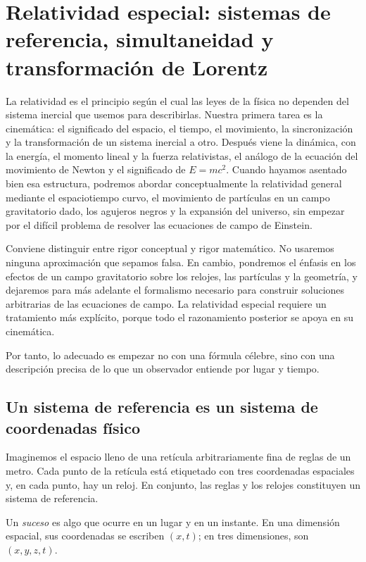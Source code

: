 \chapter{Relatividad especial: sistemas de referencia, simultaneidad y transformación de Lorentz}

La relatividad es el principio según el cual las leyes de la física no dependen del sistema inercial que usemos para describirlas. Nuestra primera tarea es la cinemática: el significado del espacio, el tiempo, el movimiento, la sincronización y la transformación de un sistema inercial a otro. Después viene la dinámica, con la energía, el momento lineal y la fuerza relativistas, el análogo de la ecuación del movimiento de Newton y el significado de \(E=mc^2\). Cuando hayamos asentado bien esa estructura, podremos abordar conceptualmente la relatividad general mediante el espaciotiempo curvo, el movimiento de partículas en un campo gravitatorio dado, los agujeros negros y la expansión del universo, sin empezar por el difícil problema de resolver las ecuaciones de campo de Einstein.

Conviene distinguir entre rigor conceptual y rigor matemático. No usaremos ninguna aproximación que sepamos falsa. En cambio, pondremos el énfasis en los efectos de un campo gravitatorio sobre los relojes, las partículas y la geometría, y dejaremos para más adelante el formalismo necesario para construir soluciones arbitrarias de las ecuaciones de campo. La relatividad especial requiere un tratamiento más explícito, porque todo el razonamiento posterior se apoya en su cinemática.

Por tanto, lo adecuado es empezar no con una fórmula célebre, sino con una descripción precisa de lo que un observador entiende por lugar y tiempo.

\section{Un sistema de referencia es un sistema de coordenadas físico}

Imaginemos el espacio lleno de una retícula arbitrariamente fina de reglas de un metro. Cada punto de la retícula está etiquetado con tres coordenadas espaciales y, en cada punto, hay un reloj. En conjunto, las reglas y los relojes constituyen un sistema de referencia.

\begin{definition}Un \emph{suceso} es algo que ocurre en un lugar y en un instante. En una dimensión espacial, sus coordenadas se escriben \((x,t)\); en tres dimensiones, son \((x,y,z,t)\).\end{definition}

